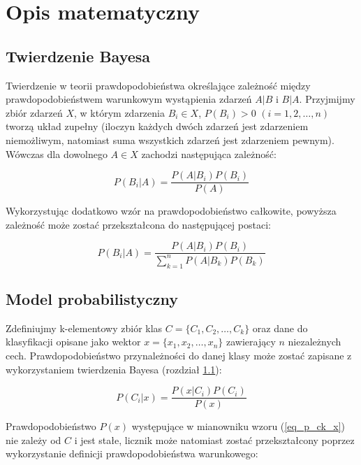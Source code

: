 \section{Opis matematyczny}
\label{sec_opis_mat}

\subsection{Twierdzenie Bayesa}
\label{subsec_tw_bayesa}
Twierdzenie w teorii prawdopodobieństwa określające zależność między prawdopodobieństwem warunkowym wystąpienia zdarzeń $A|B$ i $B|A$. Przyjmijmy zbiór zdarzeń $X$, w którym zdarzenia $B_i \in X$, $P(B_i)>0$ ${(i=1,2, \dots , n)}$ tworzą układ zupełny (iloczyn każdych dwóch zdarzeń jest zdarzeniem niemożliwym, natomiast suma wszystkich zdarzeń jest zdarzeniem pewnym). Wówczas dla dowolnego $A \in X$ zachodzi następująca zależność:

	\begin{equation}
	\label{eq_tw_bayesa_1}
		P(B_i | A) = \frac{P(A | B_i) P(B_i)}{P(A)}
	\end{equation}

Wykorzystując dodatkowo wzór na prawdopodobieństwo całkowite, powyższa zależność może zostać przekształcona do następującej postaci:

	\begin{equation}
	\label{eq_tw_bayesa_2}
		P(B_i | A) = \frac{P(A | B_i) P(B_i)}{\sum_{k=1}^{n} P(A | B_k)P(B_k)}
	\end{equation}


\subsection{Model probabilistyczny}
\label{subsec_model}

Zdefiniujmy k-elementowy zbiór klas $C = {\{C_1, C_2, \dots, C_k\}}$ oraz dane do klasyfikacji opisane jako wektor ${x = \{x_1, x_2, \dots, x_n\}}$ zawierający $n$ niezależnych cech. Prawdopodobieństwo przynależności do danej klasy może zostać zapisane z wykorzystaniem twierdzenia Bayesa (rozdział \ref{subsec_tw_bayesa}):

	\begin{equation}
	\label{eq_p_ck_x}
		P(C_i | x) = \frac{P(x | C_i) P(C_i)}{P(x)}
	\end{equation}

Prawdopodobieństwo $P(x)$ występujące w mianowniku wzoru (\ref{eq_p_ck_x}) nie zależy od $C$ i jest stałe, licznik może natomiast zostać przekształcony poprzez wykorzystanie definicji prawdopodobieństwa warunkowego:

